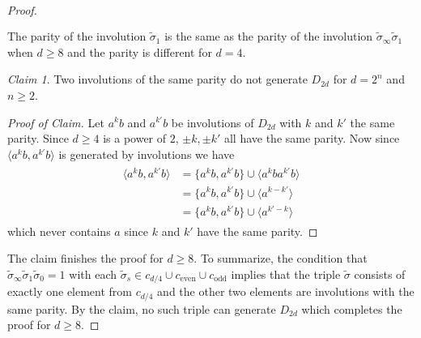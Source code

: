 \documentclass{dcthesis}
\newcommand{\wt}[1]{\widetilde{#1}}
\numberwithin{equation}{section}
\theoremstyle{definition}
\theoremstyle{remark}
\newtheorem*{claim}{Claim}
\begin{document}
{{{\begin{proof}
\begin{align}
\begin{split}
        \end{split}
      \end{align}
      The parity
      of the involution $\wt{\sigma}_1$
      is the same as the
      parity of the involution
      $\wt{\sigma}_\infty\wt{\sigma}_1$
      when $d\geq 8$
      and the parity is different for $d=4$.
      \begin{claim}
        \label{claim:sameparitydoesnotgenerate}
        Two involutions of the same parity
        do not generate $D_{2d}$ for $d=2^n$
        and $n\geq 2$.
      \end{claim}
      \begin{proof}[Proof of Claim]
        Let $a^kb$ and $a^{k'}b$ be involutions
        of $D_{2d}$ with $k$ and $k'$ the same
        parity.
        Since $d\geq 4$ is a power of $2$,
        $\pm k, \pm k'$ all have the same parity.
        Now since
        $\langle a^kb,a^{k'}b\rangle$
        is generated by involutions
        we have
        \begin{align}
          \begin{split}
            \label{eqn:generatedbyinvolutions}
            \langle a^kb,a^{k'}b\rangle
            &=
            \{a^kb,a^{k'}b\}
            \cup
            \langle a^kba^{k'}b\rangle\\
            &=
            \{a^kb,a^{k'}b\}
            \cup
            \langle a^{k-k'}\rangle\\
            &=
            \{a^kb,a^{k'}b\}
            \cup
            \langle a^{k'-k}\rangle
          \end{split}
        \end{align}
        which never contains $a$
        since $k$ and $k'$ have the same parity.
      \end{proof}
      The claim finishes the proof
      for $d\geq 8$.
      To summarize,
      the condition that
      $\wt{\sigma}_\infty\wt{\sigma}_1
      \wt{\sigma}_0=1$
      with each $\wt{\sigma}_s\in
      c_{d/4}\cup c_\text{even} \cup
      c_\text{odd}$
      implies that
      the triple $\wt{\sigma}$
      consists of exactly one element from
      $c_{d/4}$
      and the other two elements
      are involutions with the same parity.
      By the claim,
      no such triple can generate $D_{2d}$
      which completes the proof for
      $d\geq 8$.

\end{proof}}}}
\end{document}
